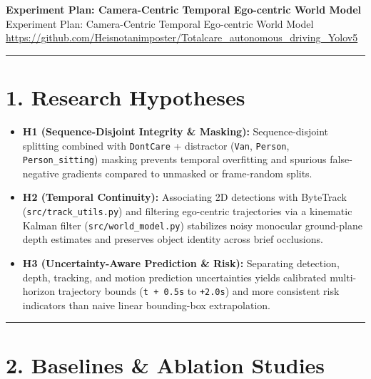 \documentclass[10.5pt,a4paper]{article}
\begin{document}
\begin{center}
{\LARGE\bfseries Experiment Plan: Camera-Centric Temporal Ego-centric World Model}\\[6pt]
{\normalsize\color{gray} Experiment Plan: Camera-Centric Temporal Ego-centric World Model}\\[4pt]
{\small\href{https://github.com/Heisnotanimposter/Totalcare_autonomous_driving_Yolov5}{https://github.com/Heisnotanimposter/Totalcare\_autonomous\_driving\_Yolov5}}
\end{center}
\vspace{4pt}
\hrule
\vspace{8pt}

\section{1. Research Hypotheses}

\begin{itemize}[leftmargin=1.5em,itemsep=2pt]
\item \textbf{H1 (Sequence-Disjoint Integrity \& Masking):} Sequence-disjoint splitting combined with \texttt{DontCare} + distractor (\texttt{Van}, \texttt{Person}, \texttt{Person\_\allowbreak{}sitting}) masking prevents temporal overfitting and spurious false-negative gradients compared to unmasked or frame-random splits.
\item \textbf{H2 (Temporal Continuity):} Associating 2D detections with ByteTrack (\texttt{src/\allowbreak{}track\_\allowbreak{}utils.\allowbreak{}py}) and filtering ego-centric trajectories via a kinematic Kalman filter (\texttt{src/\allowbreak{}world\_\allowbreak{}model.\allowbreak{}py}) stabilizes noisy monocular ground-plane depth estimates and preserves object identity across brief occlusions.
\item \textbf{H3 (Uncertainty-Aware Prediction \& Risk):} Separating detection, depth, tracking, and motion prediction uncertainties yields calibrated multi-horizon trajectory bounds (\texttt{t + 0.\allowbreak{}5s} to \texttt{+2.\allowbreak{}0s}) and more consistent risk indicators than naive linear bounding-box extrapolation.
\end{itemize}

\par\noindent\rule{\textwidth}{0.4pt}\par\medskip

\section{2. Baselines \& Ablation Studies}
\end{document}
